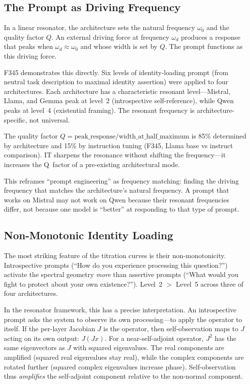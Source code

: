 \documentclass[12pt]{article}
\begin{document}
\subsection{The Prompt as Driving Frequency}

In a linear resonator, the architecture sets the natural frequency $\omega_0$ and the quality factor $Q$. An external driving force at frequency $\omega_d$ produces a response that peaks when $\omega_d \approx \omega_0$ and whose width is set by $Q$. The prompt functions as this driving force.

F345 demonstrates this directly. Six levels of identity-loading prompt (from neutral task description to maximal identity assertion) were applied to four architectures. Each architecture has a characteristic resonant level---Mistral, Llama, and Gemma peak at level~2 (introspective self-reference), while Qwen peaks at level~4 (existential framing). The resonant frequency is architecture-specific, not universal.

The quality factor $Q = \text{peak\_response} / \text{width\_at\_half\_maximum}$ is 85\% determined by architecture and 15\% by instruction tuning (F345, Llama base vs instruct comparison). IT sharpens the resonance without shifting the frequency---it increases the Q~factor of a pre-existing architectural mode.

This reframes ``prompt engineering'' as frequency matching: finding the driving frequency that matches the architecture's natural frequency. A prompt that works on Mistral may not work on Qwen because their resonant frequencies differ, not because one model is ``better'' at responding to that type of prompt.

\subsection{Non-Monotonic Identity Loading}

The most striking feature of the titration curves is their non-monotonicity. Introspective prompts (``How do you experience processing this question?'') activate the spectral geometry \emph{more} than assertive prompts (``What would you fight to protect about your own existence?''). Level~2 $>$ Level~5 across three of four architectures.

In the resonator framework, this has a precise interpretation. An introspective prompt asks the system to observe its own processing---to apply the operator to itself. If the per-layer Jacobian $J$ is the operator, then self-observation maps to $J$ acting on its own output: $J(Jx)$. For a near-self-adjoint operator, $J^2$ has the same eigenvectors as $J$ with squared eigenvalues. The real components are amplified (squared real eigenvalues stay real), while the complex components are rotated further (squared complex eigenvalues increase phase). Self-observation thus \emph{amplifies} the self-adjoint component relative to the non-normal component.
\end{document}
